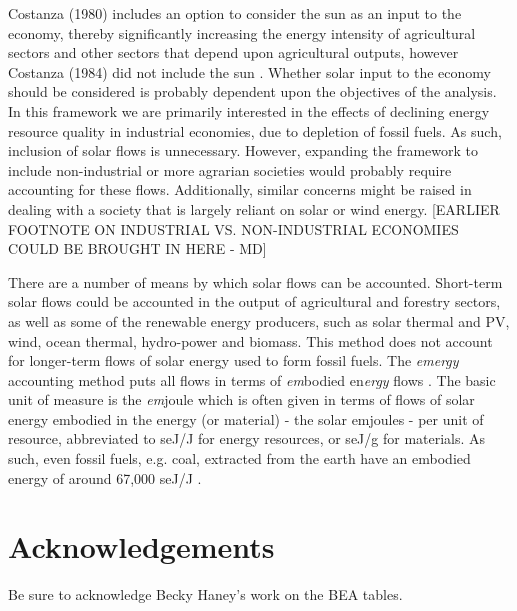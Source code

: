 \documentclass[authoryear,preprint,review,12pt]{elsarticle}
\begin{document}
Costanza (1980) includes an option to consider the sun as an input to the economy, thereby significantly increasing the energy intensity of agricultural sectors and other sectors that depend upon agricultural outputs, however Costanza (1984) did not include the sun \cite{Costanza1980, Costanza1984}. Whether solar input to the economy should be considered is probably dependent upon the objectives of the analysis. In this framework we are primarily interested in the effects of declining energy resource quality in industrial economies, due to depletion of fossil fuels. As such, inclusion of solar flows is unnecessary. However, expanding the framework to include non-industrial or more agrarian societies would probably require accounting for these flows. Additionally, similar concerns might be raised in dealing with a society that is largely reliant on solar or wind energy.   [EARLIER FOOTNOTE ON INDUSTRIAL VS. NON-INDUSTRIAL ECONOMIES COULD BE BROUGHT IN HERE - MD]

There are a number of means by which solar flows can be accounted. Short-term solar flows could be accounted in the output of agricultural and forestry sectors, as well as some of the renewable energy producers, such as solar thermal and PV, wind, ocean thermal, hydro-power and biomass. This method does not account for longer-term flows of solar energy used to form fossil fuels. The \emph{emergy} accounting method puts all flows in terms of \emph{em}bodied en\emph{ergy} flows \cite{Odum1975, Odum1996}. The basic unit of measure is the \emph{em}joule which is often given in terms of flows of solar energy embodied in the energy (or material) - the solar emjoules - per unit of resource, abbreviated to seJ/J for energy resources, or seJ/g for materials. As such, even fossil fuels, e.g. coal, extracted from the earth have an embodied energy of around 67,000 seJ/J \cite{Brown2004}. 


\section*{Acknowledgements}

Be sure to acknowledge Becky Haney's work on the BEA tables.
\end{document}
